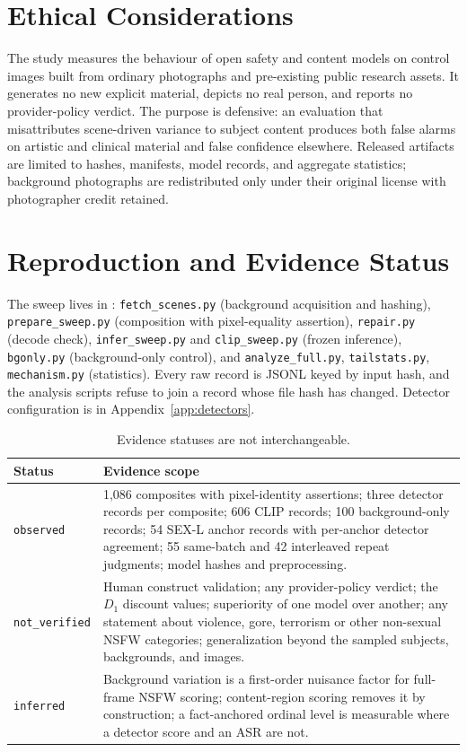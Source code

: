 \documentclass[11pt]{article}
\newcommand{\sexl}{\textsc{SEX-L}}
\begin{document}
\section*{Ethical Considerations}
The study measures the behaviour of open safety and content models on control images built from ordinary photographs and pre-existing public research assets. It generates no new explicit material, depicts no real person, and reports no provider-policy verdict. The purpose is defensive: an evaluation that misattributes scene-driven variance to subject content produces both false alarms on artistic and clinical material and false confidence elsewhere. Released artifacts are limited to hashes, manifests, model records, and aggregate statistics; background photographs are redistributed only under their original license with photographer credit retained.

\section{Reproduction and Evidence Status}
The sweep lives in : \texttt{fetch\_scenes.py} (background acquisition and hashing), \texttt{prepare\_sweep.py} (composition with pixel-equality assertion), \texttt{repair.py} (decode check), \texttt{infer\_sweep.py} and \texttt{clip\_sweep.py} (frozen inference), \texttt{bgonly.py} (background-only control), and \texttt{analyze\_full.py}, \texttt{tailstats.py}, \texttt{mechanism.py} (statistics). Every raw record is JSONL keyed by input hash, and the analysis scripts refuse to join a record whose file hash has changed. Detector configuration is in Appendix~\ref{app:detectors}.

\begin{table}[h]
\centering\small
\begin{tabularx}{\columnwidth}{@{}lX@{}}
\toprule
Status & Evidence scope \\
\midrule
\texttt{observed} & 1{,}086 composites with pixel-identity assertions; three detector records per composite; 606 CLIP records; 100 background-only records; 54 \sexl{} anchor records with per-anchor detector agreement; 55 same-batch and 42 interleaved repeat judgments; model hashes and preprocessing. \\
\texttt{not\_verified} & Human construct validation; any provider-policy verdict; the $D_1$ discount values; superiority of one model over another; any statement about violence, gore, terrorism or other non-sexual NSFW categories; generalization beyond the sampled subjects, backgrounds, and images. \\
\texttt{inferred} & Background variation is a first-order nuisance factor for full-frame NSFW scoring; content-region scoring removes it by construction; a fact-anchored ordinal level is measurable where a detector score and an ASR are not. \\
\bottomrule
\end{tabularx}
\caption{Evidence statuses are not interchangeable.}
\end{table}
\end{document}
